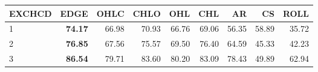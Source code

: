 \begin{table}[ht]
\centering
\begin{tabular}{lrrrrrrrr}
  \hline
EXCHCD & EDGE & OHLC & CHLO & OHL & CHL & AR & CS & ROLL \\ 
  \hline
1 & \textbf{74.17} & 66.98 & 70.93 & 66.76 & 69.06 & 56.35 & 58.89 & 35.72 \\ 
  2 & \textbf{76.85} & 67.56 & 75.57 & 69.50 & 76.40 & 64.59 & 45.33 & 42.23 \\ 
  3 & \textbf{86.54} & 79.71 & 83.60 & 80.20 & 83.09 & 78.43 & 49.89 & 62.94 \\ 
   \hline
\end{tabular}
\end{table}
